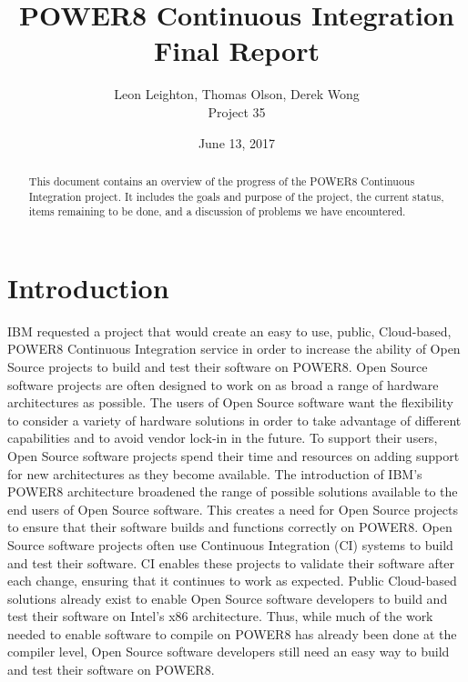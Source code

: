 \documentclass[10pt,letterpaper,onecolumn,draftclsnofoot]{IEEEtran}
\begin{document}
\begin{titlepage}
  \title{POWER8 Continuous Integration\\ Final Report}
  \author{Leon Leighton, Thomas Olson, Derek Wong\\Project 35}
  \date{June 13, 2017}
  \maketitle
  \vspace{4cm}
  \begin{abstract}
  \noindent This document contains an overview of the progress of the POWER8 Continuous Integration project.
    It includes the goals and purpose of the project, the current status, items remaining to be done, 
    and a discussion of problems we have encountered. 
 \end{abstract}
\end{titlepage}

\setcounter{tocdepth}{2}
\tableofcontents
\clearpage
\section{Introduction}
IBM requested a project that would create an easy to use, public, Cloud-based, 
POWER8 Continuous Integration service in order to increase the ability
of Open Source projects to build and test their software on POWER8.
Open Source software projects are often designed to work on as broad a range of hardware architectures as possible. 
The users of Open Source software want the flexibility to consider a variety of hardware solutions in order to take advantage of different capabilities and to avoid vendor lock-in in the future. 
To support their users, Open Source software projects spend their time and resources on adding support for new architectures as they become available. 
The introduction of IBM's POWER8 architecture broadened the range of possible solutions available to the end users of Open Source software. 
This creates a need for Open Source projects to ensure that their software builds and functions correctly on POWER8. 
Open Source software projects often use Continuous Integration (CI) systems to build and test their software. 
CI enables these projects to validate their software after each change, ensuring that it continues to work as expected. 
Public Cloud-based solutions already exist to enable Open Source software developers to build and test their software on Intel's x86 architecture. 
Thus, while much of the work needed to enable software to compile on POWER8 has already been done at the compiler level, Open Source software developers still need an easy way to build and test their software on POWER8. \\
\end{document}
